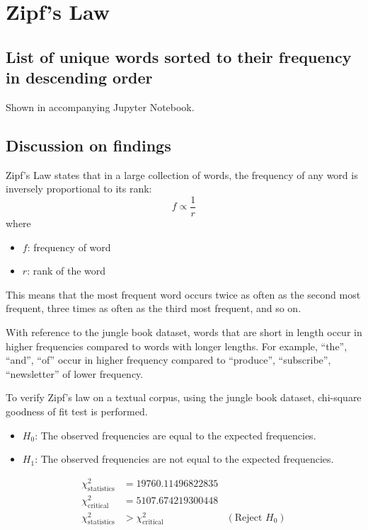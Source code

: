 \section{Zipf's Law}

\subsection*{List of unique words sorted to their frequency in descending order}
Shown in accompanying Jupyter Notebook.


\subsection*{Discussion on findings}
Zipf's Law states that in a large collection of words, the frequency of any word is inversely proportional to its rank:
$$f \propto \frac{1}{r}$$
where  
\begin{itemize}
    \item $f$: frequency of word  
    \item $r$: rank of the word
\end{itemize}

This means that the most frequent word occurs twice as often as the second most frequent, three times as often as the third most frequent, and so on.

With reference to the jungle book dataset, words that are short in length occur in higher frequencies compared to words with longer lengths. 
For example, ``the'', ``and'', ``of'' occur in higher frequency compared to ``produce'', ``subscribe'', ``newsletter'' of lower frequency.
\newline

To verify Zipf's law on a textual corpus, using the jungle book dataset, chi-square goodness of fit test is performed.  
\begin{itemize}
    \item $H_0$: The observed frequencies are equal to the expected frequencies.  
    \item $H_1$: The observed frequencies are not equal to the expected frequencies. 
\end{itemize}

\begin{align*}
    \chi^2_{\text{statistics}} & = 19760.11496822835 \\
    \chi^2_{\text{critical}} & = 5107.674219300448 \\
    \chi^2_{\text{statistics}} & > \chi^2_{\text{critical}} & (\text{Reject } H_0)
\end{align*}

